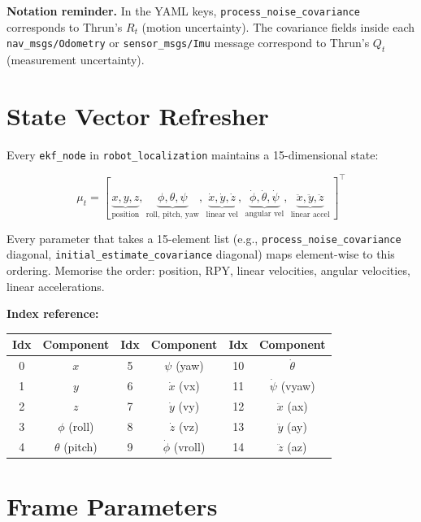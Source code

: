 \documentclass[11pt,a4paper]{article}
\begin{document}
\textbf{Notation reminder.} In the YAML keys, \texttt{process\_noise\_covariance} corresponds to Thrun's $R_t$ (motion uncertainty). The covariance fields inside each \texttt{nav\_msgs/Odometry} or \texttt{sensor\_msgs/Imu} message correspond to Thrun's $Q_t$ (measurement uncertainty).

\section{State Vector Refresher}

Every \texttt{ekf\_node} in \texttt{robot\_localization} maintains a 15-dimensional state:

\[
\mu_t = [\,\underbrace{x, y, z}_{\text{position}},\, \underbrace{\phi, \theta, \psi}_{\text{roll, pitch, yaw}},\, \underbrace{\dot{x}, \dot{y}, \dot{z}}_{\text{linear vel}},\, \underbrace{\dot{\phi}, \dot{\theta}, \dot{\psi}}_{\text{angular vel}},\, \underbrace{\ddot{x}, \ddot{y}, \ddot{z}}_{\text{linear accel}}\,]^\top
\]

Every parameter that takes a 15-element list (e.g., \texttt{process\_noise\_covariance} diagonal, \texttt{initial\_estimate\_covariance} diagonal) maps element-wise to this ordering. Memorise the order: position, RPY, linear velocities, angular velocities, linear accelerations.

\textbf{Index reference:}

\begin{center}
\footnotesize
\begin{tabular}{cc|cc|cc}
\toprule
Idx & Component & Idx & Component & Idx & Component \\
\midrule
0 & $x$ & 5 & $\psi$ (yaw) & 10 & $\dot{\theta}$ \\
1 & $y$ & 6 & $\dot{x}$ (vx) & 11 & $\dot{\psi}$ (vyaw) \\
2 & $z$ & 7 & $\dot{y}$ (vy) & 12 & $\ddot{x}$ (ax) \\
3 & $\phi$ (roll) & 8 & $\dot{z}$ (vz) & 13 & $\ddot{y}$ (ay) \\
4 & $\theta$ (pitch) & 9 & $\dot{\phi}$ (vroll) & 14 & $\ddot{z}$ (az) \\
\bottomrule
\end{tabular}
\end{center}

\section{Frame Parameters}
\end{document}
